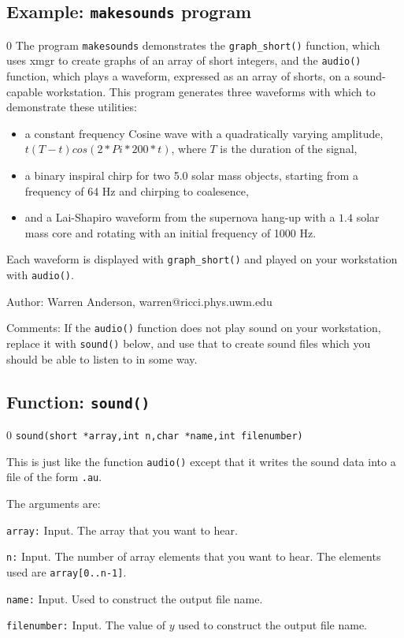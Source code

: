 \subsection{Example: {\tt makesounds} program}
\setcounter{equation}0
The program {\tt makesounds} demonstrates the {\tt graph\_short()} function, which uses xmgr to create graphs
of an array of short integers, and the {\tt audio()} function, which plays a
waveform, expressed as an array of shorts, on a sound-capable workstation. This program
generates three waveforms with which to demonstrate these utilities:
\begin{itemize}
\item a constant frequency Cosine wave with a quadratically varying amplitude,
$t(T-t)cos(2*Pi*200*t)$, where $T$ is the duration of the signal,
\item a binary inspiral chirp for two 5.0 solar mass objects, starting from a
frequency of 64 Hz and chirping to coalesence,
\item and a Lai-Shapiro waveform from the supernova hang-up with a $1.4$ solar
mass core and rotating with an initial frequency of 1000 Hz.
\end{itemize}
Each waveform is displayed with {\tt graph\_short()} and played on your
workstation with {\tt audio()}.
\begin{description}
\item{Author:}
Warren Anderson, warren@ricci.phys.uwm.edu
\item{Comments:}
If the {\tt audio()} function does not play sound on your workstation,
replace it with {\tt sound()} below, and use that to create sound files
which you should be able to listen to in some way.
\end{description}
\clearpage

\subsection{Function: {\tt sound()}}
\setcounter{equation}0
{\tt sound(short *array,int n,char *name,int filenumber)}

This is just like the function {\tt audio()} except that it writes
the sound data into a file of the form {\tt *.au}.

The arguments are:
\begin{description}
\item{\tt array:} Input.  The array that you want to hear.
\item{\tt n:} Input.  The number of array elements that you want to hear.
  The elements used are {\tt array[0..n-1]}.
\item{\tt name:} Input.  Used to construct the output file name.
\item{\tt filenumber:} Input.  The value of $y$ used to construct the output file name.
\end{description}


